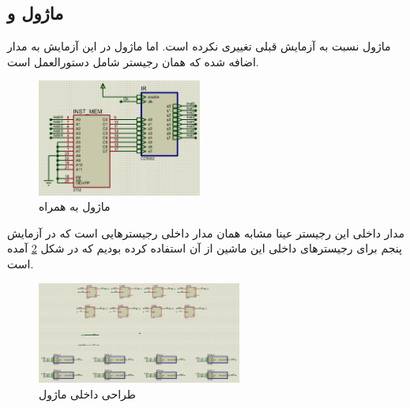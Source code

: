 \documentclass[12pt,onecolumn,a4paper,fleqn]{article}
\begin{document}
\subsection{ماژول  و }
ماژول 
نسبت به آزمایش قبلی تغییری نکرده است. اما ماژول
در این آزمایش به مدار اضافه شده که همان رجیستر شامل دستورالعمل است.
\begin{figure}[H]
	\centering
	\includegraphics[width=0.48\textwidth]{source/instmem_interface.png}
	\caption{ماژول  به همراه }
	\label{fig:instmem_interface}
\end{figure}
مدار داخلی این رجیستر عینا مشابه همان مدار داخلی رجیسترهایی است که در آزمایش پنجم برای رجیستر‌های داخلی این ماشین از آن‌ استفاده کرده بودیم که در شکل \ref{fig:is-inner} آمده است.
\begin{figure}[H]
	\centering
	\includegraphics[width=0.6\textwidth]{source/is_inner.png}
	\caption{طراحی داخلی ماژول }
	\label{fig:is-inner}
\end{figure}
\end{document}
